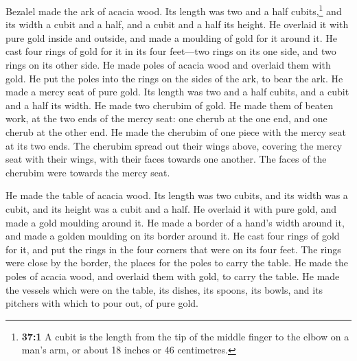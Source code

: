  Bezalel made the ark of acacia wood. Its length was two
and a half cubits,\footnote{\textbf{37:1} A cubit is the length from the
  tip of the middle finger to the elbow on a man's arm, or about 18
  inches or 46 centimetres.} and its width a cubit and a half, and a
cubit and a half its height.  He overlaid it with pure
gold inside and outside, and made a moulding of gold for it around it.
 He cast four rings of gold for it in its four feet---two
rings on its one side, and two rings on its other side. 
He made poles of acacia wood and overlaid them with gold. 
He put the poles into the rings on the sides of the ark, to bear the
ark.  He made a mercy seat of pure gold. Its length was
two and a half cubits, and a cubit and a half its width. 
He made two cherubim of gold. He made them of beaten work, at the two
ends of the mercy seat:  one cherub at the one end, and
one cherub at the other end. He made the cherubim of one piece with the
mercy seat at its two ends.  The cherubim spread out their
wings above, covering the mercy seat with their wings, with their faces
towards one another. The faces of the cherubim were towards the mercy
seat.

 He made the table of acacia wood. Its length was two
cubits, and its width was a cubit, and its height was a cubit and a
half.  He overlaid it with pure gold, and made a gold
moulding around it.  He made a border of a hand's width
around it, and made a golden moulding on its border around it.
 He cast four rings of gold for it, and put the rings in
the four corners that were on its four feet.  The rings
were close by the border, the places for the poles to carry the table.
 He made the poles of acacia wood, and overlaid them with
gold, to carry the table.  He made the vessels which were
on the table, its dishes, its spoons, its bowls, and its pitchers with
which to pour out, of pure gold.

